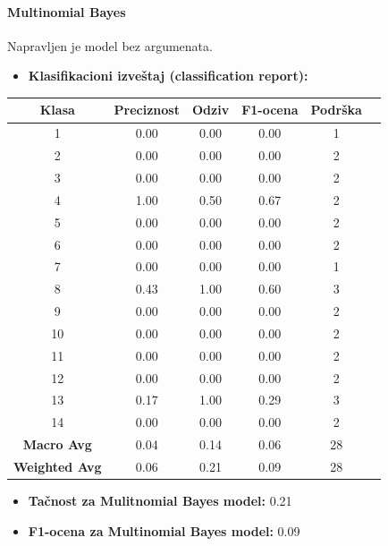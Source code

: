\documentclass{article}
\begin{document}
\vspace{3mm}

\paragraph{Multinomial Bayes}
\begin{flushleft}
Napravljen je model bez argumenata. \\


\begin{itemize}
\item \textbf{Klasifikacioni izveštaj (classification report):}
\end{itemize}
\begin{table}[ht]
    \centering
    \begin{tabular}{cccccc}
        \textbf{Klasa} & \textbf{Preciznost} & \textbf{Odziv} & \textbf{F1-ocena} & \textbf{Podrška} \\
        \hline
        1 & 0.00 & 0.00 & 0.00 & 1 \\
        2 & 0.00 & 0.00 & 0.00 & 2 \\
        3 & 0.00 & 0.00 & 0.00 & 2 \\
        4 & 1.00 & 0.50 & 0.67 & 2 \\
        5 & 0.00 & 0.00 & 0.00 & 2 \\
        6 & 0.00 & 0.00 & 0.00 & 2 \\
        7 & 0.00 & 0.00 & 0.00 & 1 \\
        8 & 0.43 & 1.00 & 0.60 & 3 \\
        9 & 0.00 & 0.00 & 0.00 & 2 \\
        10 & 0.00 & 0.00 & 0.00 & 2 \\
        11 & 0.00 & 0.00 & 0.00 & 2 \\
        12 & 0.00 & 0.00 & 0.00 & 2 \\
        13 & 0.17 & 1.00 & 0.29 & 3 \\
        14 & 0.00 & 0.00 & 0.00 & 2 \\
        \hline
        \textbf{Macro Avg} & 0.04 & 0.14 & 0.06 & 28 \\
        \textbf{Weighted Avg} & 0.06 & 0.21 & 0.09 & 28 \\
    \end{tabular}
    \label{tab:classification-report-multinomial-bayes}
\end{table}

\begin{itemize}
  \item \textbf{Tačnost za Mulitnomial Bayes model:} 0.21
    \item \textbf{F1-ocena za Multinomial Bayes model:} 0.09
\end{itemize}
\end{flushleft}
\end{document}
